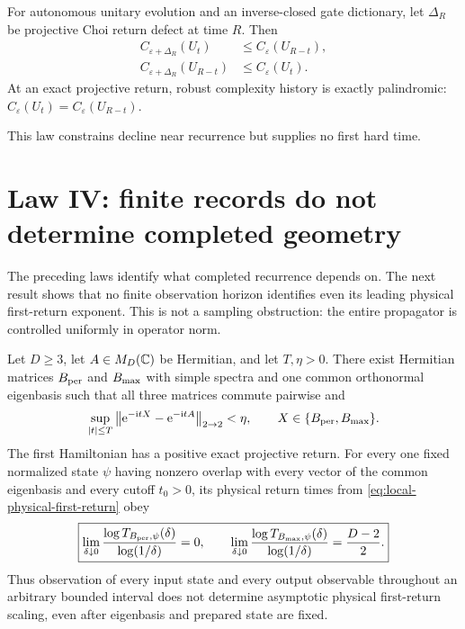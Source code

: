 \begin{theorem}
\label{thm:reflection}
For autonomous unitary evolution and an inverse-closed gate dictionary, let
$\Delta_R$ be projective Choi return defect at time $R$.  Then
\begin{align}
 C_{\varepsilon+\Delta_R}(U_t)&\le C_\varepsilon(U_{R-t}),\\
 C_{\varepsilon+\Delta_R}(U_{R-t})&\le C_\varepsilon(U_t).
 \label{eq:reflection}
\end{align}
At an exact projective return, robust complexity history is exactly
palindromic: $C_\varepsilon(U_t)=C_\varepsilon(U_{R-t})$.
\end{theorem}

This law constrains decline near recurrence but supplies no first hard time.

\section{Law IV: finite records do not determine completed geometry}

The preceding laws identify what completed recurrence depends on.  The next
result shows that no finite observation horizon identifies even its leading
physical first-return exponent.  This is not a sampling obstruction: the
entire propagator is controlled uniformly in operator norm.

\begin{theorem}
\label{thm:horizon-instability}
Let $D\ge3$, let $A\in M_D(\mathbb C)$ be Hermitian, and let $T,\eta>0$.  There
exist Hermitian matrices $B_{\rm per}$ and $B_{\rm max}$ with simple spectra
and one common orthonormal eigenbasis such that all three matrices commute
pairwise and
\begin{equation}
 \sup_{|t|\le T}\left\|\mathrm e^{-\mathrm i tX}
              -\mathrm e^{-\mathrm i tA}\right\|_{2\to2}<\eta,
 \qquad X\in\{B_{\rm per},B_{\rm max}\}.             \label{eq:horizon-tube}
\end{equation}
The first Hamiltonian has a positive exact projective return.  For every one
fixed normalized state $\psi$ having nonzero overlap with every vector of the
common eigenbasis and every cutoff $t_0>0$, its physical return times from
\eqref{eq:local-physical-first-return} obey
\begin{equation}
 \boxed{
 \lim_{\delta\downarrow0}
   \frac{\log T_{B_{\rm per},\psi}(\delta)}{\log(1/\delta)}=0,
 \qquad
 \lim_{\delta\downarrow0}
   \frac{\log T_{B_{\rm max},\psi}(\delta)}{\log(1/\delta)}
     =\frac{D-2}{2}.}                                  \label{eq:horizon-exponents}
\end{equation}
Thus observation of every input state and every output observable throughout
an arbitrary bounded interval does not determine asymptotic physical
first-return scaling, even after eigenbasis and prepared state are fixed.
\end{theorem}

